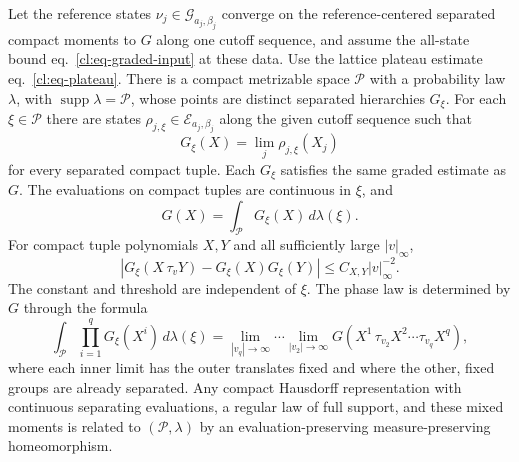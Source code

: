 \documentclass[11pt,letterpaper,reqno]{amsart}
\makeatletter
\numberwithin{equation}{section}
\renewcommand{\eqref}[1]{\textup{eq.~\ref{#1}}}
\theoremstyle{definition}
\newcommand{\ms@majorstart}{%
  \pushQED{\qed}\renewcommand{\qedsymbol}{$\blacksquare\square$}}
\newenvironment{theorem}[1][]{\ms@majorstart\ms@theorem[#1]}
  {\popQED\endms@theorem}
\theoremstyle{remark}
\makeatother
\begin{document}
\begin{theorem}[The phase law of a reference limit]
\label{cl:thm-phase-law}
Let the reference states \(\nu_j\in\mathcal G_{a_j,\beta_j}\)
converge on the reference-centered separated compact moments
to \(G\) along one cutoff sequence, and assume the all-state
bound \eqref{cl:eq-graded-input} at these data. Use the
lattice plateau estimate \eqref{cl:eq-plateau}.
There is a compact metrizable space \(\mathcal P\) with
a probability law \(\lambda\),
with \(\operatorname{supp}\lambda=\mathcal P\), whose points
are distinct separated hierarchies \(G_\xi\).
For each \(\xi\in\mathcal P\) there are states
\(\rho_{j,\xi}\in\mathcal E_{a_j,\beta_j}\) along the given
cutoff sequence such that
\[
       G_\xi(X)=\lim_j\rho_{j,\xi}(X_j)
\]
for every separated compact tuple. Each \(G_\xi\) satisfies
the same graded estimate as \(G\). The evaluations on
compact tuples are continuous in \(\xi\), and
\begin{equation}\label{cl:eq-phase-barycentre}
                  G(X)=\int_{\mathcal P}G_\xi(X)\,d\lambda(\xi).
\end{equation}
For compact tuple polynomials \(X,Y\) and all sufficiently
large \(|v|_\infty\),
\begin{equation}\label{cl:eq-pure-cluster}
 |G_\xi(X\,\tau_vY)-G_\xi(X)G_\xi(Y)|
             \le C_{X,Y}|v|_\infty^{-2}.
\end{equation}
The constant and threshold are independent of \(\xi\).
The phase law is determined by \(G\) through the formula
\begin{equation}\label{cl:eq-phase-mixed}
 \int_{\mathcal P}\prod_{i=1}^q G_\xi(X^i)\,d\lambda(\xi)
 =\lim_{|v_q|\to\infty}\cdots\lim_{|v_2|\to\infty}
        G(X^1\,\tau_{v_2}X^2\cdots\tau_{v_q}X^q),
\end{equation}
where each inner limit has the outer translates fixed and
where the other, fixed groups are already separated.
Any compact Hausdorff representation with continuous
separating evaluations, a regular law of full support,
and these mixed moments is related to \((\mathcal P,\lambda)\)
by an evaluation-preserving measure-preserving homeomorphism.
\end{theorem}
\end{document}
